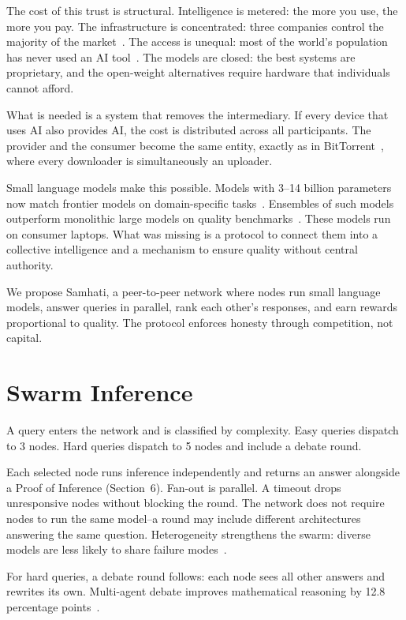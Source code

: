 \documentclass[11pt,a4paper]{article}
\begin{document}
The cost of this trust is structural. Intelligence is metered: the more you use, the more you pay. The infrastructure is concentrated: three companies control the majority of the market~\cite{ai-monopoly}. The access is unequal: most of the world's population has never used an AI tool~\cite{world-bank}. The models are closed: the best systems are proprietary, and the open-weight alternatives require hardware that individuals cannot afford.

What is needed is a system that removes the intermediary. If every device that uses AI also provides AI, the cost is distributed across all participants. The provider and the consumer become the same entity, exactly as in BitTorrent~\cite{bittorrent}, where every downloader is simultaneously an uploader.

Small language models make this possible. Models with 3--14 billion parameters now match frontier models on domain-specific tasks~\cite{phi4,qwen35,gemma3}. Ensembles of such models outperform monolithic large models on quality benchmarks~\cite{moa}. These models run on consumer laptops. What was missing is a protocol to connect them into a collective intelligence and a mechanism to ensure quality without central authority.

We propose Samhati, a peer-to-peer network where nodes run small language models, answer queries in parallel, rank each other's responses, and earn rewards proportional to quality. The protocol enforces honesty through competition, not capital.

\section{Swarm Inference}

A query enters the network and is classified by complexity. Easy queries dispatch to 3 nodes. Hard queries dispatch to 5 nodes and include a debate round.

Each selected node runs inference independently and returns an answer alongside a Proof of Inference (Section~6). Fan-out is parallel. A timeout drops unresponsive nodes without blocking the round. The network does not require nodes to run the same model--a round may include different architectures answering the same question. Heterogeneity strengthens the swarm: diverse models are less likely to share failure modes~\cite{diversity}.

For hard queries, a debate round follows: each node sees all other answers and rewrites its own. Multi-agent debate improves mathematical reasoning by 12.8 percentage points~\cite{debate}.
\end{document}
